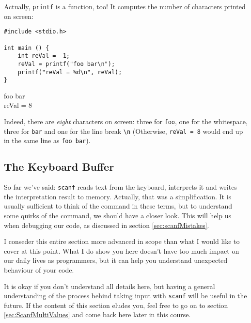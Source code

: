 \begin{hintbox}
Actually, \texttt{printf} is a function, too! It computes the number of characters printed on screen:

\begin{tcbraster}[raster columns=2,
                  raster equal height,
                  nobeforeafter,
                  raster column skip=0.2cm]
\begin{codebox}[printCount.c]
\begin{verbatim}
#include <stdio.h>

int main () {
    int reVal = -1;
    reVal = printf("foo bar\n");
    printf("reVal = %d\n", reVal);
}
\end{verbatim}
\end{codebox}
%
\begin{cmdbox}
foo bar \\
reVal = 8
\end{cmdbox}
\end{tcbraster}

Indeed, there are \emph{eight} characters on screen: three for \texttt{foo}, one for the whitespace, three for \texttt{bar} and one for the line break \texttt{\textbackslash n} (Otherwise, \texttt{reVal = 8} would end up in the same line as \texttt{foo bar}).
\end{hintbox}

\subsection{The Keyboard Buffer} \label{sec:scanf_keyboardBuffer}
So far we've said: \texttt{scanf} reads text from the keyboard, interprets it and writes the interpretation result to memory. Actually, that was a simplification. It is usually sufficient to think of the command in these terms, but to understand some quirks of the command, we should have a closer look. This will help us when debugging our code, as discussed in section \ref{sec:scanfMistakes}.

\begin{plusbox}
I conseder this entire section more advanced in scope than what I would like to cover at this point. What I do show you here doesn't have too much impact on our daily lives as programmers, but it can help you understand unexpected behaviour of your code.

It is okay if you don't understand all details here, but having a general understanding of the process behind taking input with \texttt{scanf} will be useful in the future. If the content of this section eludes you, feel free to go on to section \ref{sec:ScanfMultiValues} and come back here later in this course.
\end{plusbox}

